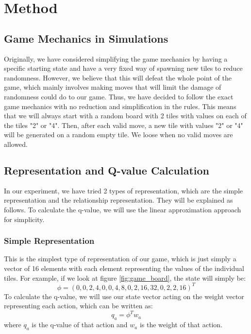 \section{Method}
\subsection{Game Mechanics in Simulations}
Originally, we have considered simplifying the game mechanics by having a specific starting state and have a very fixed way of spawning new tiles to reduce randomness. However, we believe that this will defeat the whole point of the game, which mainly involves making moves that will limit the damage of randomness could do to our game. Thus, we have decided to follow the exact game mechanics with no reduction and simplification in the rules. This means that we will always start with a random board with 2 tiles with values on each of the tiles "2" or "4". Then, after each valid move, a new tile with values "2" or "4" will be generated  on a random empty tile. We loose when no valid moves are allowed.

\subsection{Representation and Q-value Calculation}
In our experiment, we have tried 2 types of representation, which are the simple representation and the relationship representation. They will be explained as follows. To calculate the q-value, we will use the linear approximation approach for simplicity.

\subsubsection{Simple Representation}
This is the simplest type of representation of our game, which is just simply a vector of 16 elements with each element representing the values of the individual tiles. For example, if we look at figure \ref{fig:game_board}, the state will simply be:
\begin{equation*}
\phi = (0,0,2,4,0,0,4,8,0,2,16,32,0,2,2,16)^{T}
\end{equation*}
To calculate the q-value, we will use our state vector acting on the weight vector representing each action, which can be written as:
\begin{equation*}
q_{a} = \phi ^{T} w_{a}
\end{equation*}
where $q_{a}$ is the q-value of that action and $w_{a}$ is the weight of that action.

